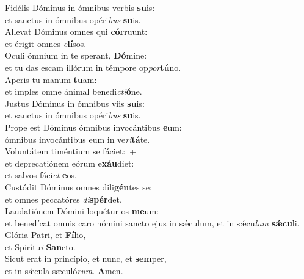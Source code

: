 \evenverse Fidélis Dóminus in ómnibus verbis \textbf{su}is:~\*\\
\evenverse et sanctus in ómnibus opéri\textit{bus} \textbf{su}is.\\
\oddverse Allevat Dóminus omnes qui \textbf{cór}ruunt:~\*\\
\oddverse et érigit omnes \textit{e}\textbf{lí}sos.\\
\evenverse Oculi ómnium in te sperant, \textbf{Dó}mine:~\*\\
\evenverse et tu das escam illórum in témpore op\textit{por}\textbf{tú}no.\\
\oddverse Aperis tu manum \textbf{tu}am:~\*\\
\oddverse et imples omne ánimal benedi\textit{cti}\textbf{ó}ne.\\
\evenverse Justus Dóminus in ómnibus viis \textbf{su}is:~\*\\
\evenverse et sanctus in ómnibus opéri\textit{bus} \textbf{su}is.\\
\oddverse Prope est Dóminus ómnibus invocántibus \textbf{e}um:~\*\\
\oddverse ómnibus invocántibus eum in ve\textit{ri}\textbf{tá}te.\\
\evenverse Voluntátem timéntium se fáciet:~+\\
\evenverse  et deprecatiónem eórum e\textbf{xáu}diet:~\*\\
\evenverse et salvos fáci\textit{et} \textbf{e}os.\\
\oddverse Custódit Dóminus omnes dili\textbf{gén}tes se:~\*\\
\oddverse et omnes peccatóres \textit{di}\textbf{spér}det.\\
\evenverse Laudatiónem Dómini loquétur os \textbf{me}um:~\*\\
\evenverse et benedícat omnis caro nómini sancto ejus in sǽculum, et in sǽcu\textit{lum} \textbf{sǽ}\textbf{cu}li.\\
\oddverse Glória Patri, et \textbf{Fí}lio,~\*\\
\oddverse et Spirítu\textit{i} \textbf{San}cto.\\
\evenverse Sicut erat in princípio, et nunc, et \textbf{sem}per,~\*\\
\evenverse et in sǽcula sæculó\textit{rum}. \textbf{A}men.\\

